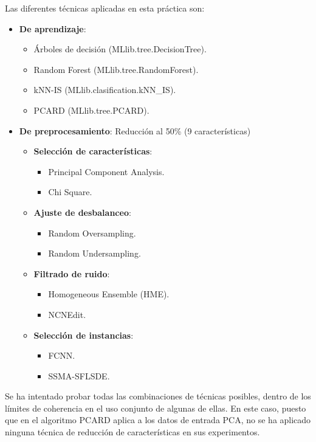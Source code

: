 Las diferentes técnicas aplicadas en esta práctica son:
\begin{itemize}
    \item \textbf{De aprendizaje}: \begin{itemize}
        \item Árboles de decisión (MLlib.tree.DecisionTree).
        \item Random Forest (MLlib.tree.RandomForest).
        \item kNN-IS (MLlib.clasification.kNN_IS).
        \item PCARD (MLlib.tree.PCARD).
    \end{itemize}
    \item \textbf{De preprocesamiento}: Reducción al 50\% (9 características)\begin{itemize}
        \item \textbf{Selección de características}: \begin{itemize}
            \item Principal Component Analysis.
            \item Chi Square.
        \end{itemize}
        \item \textbf{Ajuste de desbalanceo}: \begin{itemize}
            \item Random Oversampling.
            \item Random Undersampling.
        \end{itemize}
        \item \textbf{Filtrado de ruido}: \begin{itemize}
            \item Homogeneous Ensemble (HME).
            \item NCNEdit.
        \end{itemize}
        \item \textbf{Selección de instancias}: \begin{itemize}
            \item FCNN.
            \item SSMA-SFLSDE.
        \end{itemize}
    \end{itemize}
\end{itemize}


Se ha intentado probar todas las combinaciones de técnicas posibles, dentro de los límites de coherencia en el uso conjunto de algunas de ellas. En este caso, puesto que en el algoritmo PCARD aplica a los datos de entrada PCA, no se ha aplicado ninguna técnica de reducción de características en sus experimentos.

